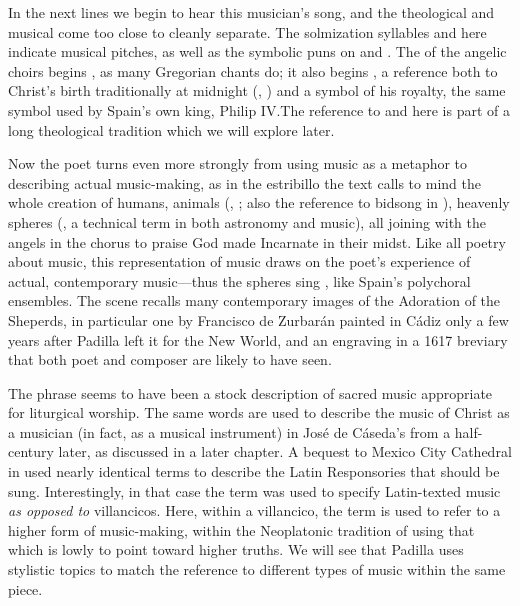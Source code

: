 In the next lines we begin to hear this musician's song, and the theological and
musical come too close to cleanly separate.
The solmization syllables  and  here indicate musical
pitches, as well as the symbolic puns on  and .
The  of the angelic choirs begins , as many
Gregorian  chants do; it also begins , a reference both to Christ's birth traditionally at midnight (, ) and a symbol of his royalty, the same
symbol used by Spain's own king, Philip IV.
The reference to  and  here is part of a long
theological tradition which we will explore later.


Now the poet turns even more strongly from using music as a metaphor to
describing actual music-making, as in the estribillo the text calls to mind the
whole creation of humans, animals (, ; also
the reference to bidsong in ),
heavenly spheres (, a technical term in both astronomy
and music), all joining with the angels in the chorus to praise God made
Incarnate in their midst.
Like all poetry about music, this representation of music draws on the poet's
experience of actual, contemporary music---thus the spheres sing , like Spain's polychoral ensembles.
The scene recalls many contemporary images of the Adoration of the Sheperds, in
particular one by Francisco de Zurbarán painted in Cádiz only a few years after
Padilla left it for the New World, and an engraving in a 1617\XXX{} breviary
that both poet and composer are likely to have seen.\citXXX

The phrase  seems to have been a stock
description of sacred music appropriate for liturgical worship.
The same words are used to describe the music of Christ as a musician (in fact,
as a musical instrument) in José de Cáseda's  from
a half-century later, as discussed in a later chapter. %
A bequest\XXX{} to Mexico City Cathedral in \XXX[year] used nearly identical
terms to describe the Latin Responsories that should be sung.
Interestingly, in that case the term was used to specify Latin-texted music
\emph{as opposed to} villancicos.
Here, within a villancico, the term is used to refer to a higher form of
music-making, within the Neoplatonic tradition of using that which is lowly to
point toward higher truths. 
We will see that Padilla uses stylistic topics to match the reference to
different types of music within the same piece.

